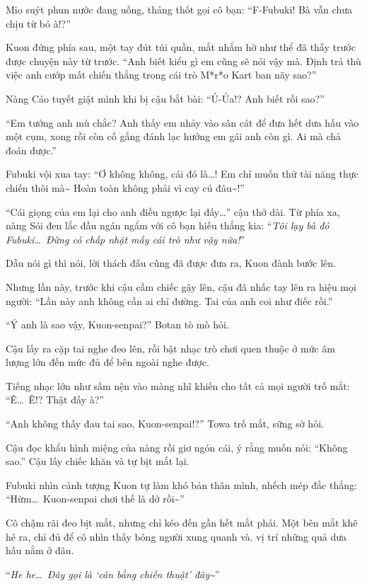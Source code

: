 \documentclass[../main.tex]{subfiles}
\begin{document}
Mio suýt phun nước đang uống, thảng thốt gọi cô bạn: ``F-Fubuki! Bà vẫn chưa chịu từ bỏ à!?''

Kuon đứng phía sau, một tay đút túi quần, mắt nhắm hờ như thể đã thấy trước được chuyện này từ trước. ``Anh biết kiểu gì em cũng sẽ nói vậy mà. Định trả thù việc anh cướp mất chiến thắng trong cái trò M*r*o Kart ban nãy sao?''

Nàng Cáo tuyết giật mình khi bị cậu bắt bài: ``Ủ-Ủa!? Anh biết rồi sao?''

``Em tưởng anh mù chắc? Anh thấy em nhảy vào sân cát để đưa hết dưa hấu vào một cụm, xong rồi còn cố gắng đánh lạc hướng em gái anh còn gì. Ai mà chả đoán được.''

Fubuki vội xua tay: ``Ơ không không, cái đó là\dots! Em chỉ muốn thử tài năng thực chiến thôi mà\~{} Hoàn toàn không phải vì cay cú đâu\~{}!''

``Cái giọng của em lại cho anh điều ngược lại đấy\dots'' cậu thở dài. Từ phía xa, nàng Sói đen lắc đầu ngán ngẩm với cô bạn hiếu thắng kia: ``\textit{Tôi lạy bà đó Fubuki\dots\ Đừng có chấp nhặt mấy cái trò như vậy nữa!}''

\ct

Dẫu nói gì thì nói, lời thách đấu cũng đã được đưa ra, Kuon đành bước lên.

Nhưng lần này, trước khi cậu cầm chiếc gậy lên, cậu đã nhấc tay lên ra hiệu mọi người: ``Lần này anh không cần ai chỉ đường. Tai của anh coi như điếc rồi.''

``Ý anh là sao vậy, Kuon-senpai?'' Botan tò mò hỏi.

Cậu lấy ra cặp tai nghe đeo lên, rồi bật nhạc trò chơi quen thuộc ở mức âm lượng lớn đến mức đủ để bên ngoài nghe được.

Tiếng nhạc lớn như sấm nện vào màng nhĩ khiến cho tất cả mọi người trố mắt: ``Ê\dots\ Ê!? Thật đấy à?''

``Anh không thấy đau tai sao, Kuon-senpai!?'' Towa trố mắt, sững sờ hỏi.

Cậu đọc khẩu hình miệng của nàng rồi giơ ngón cái, ý rằng muốn nói: ``Không sao.'' Cậu lấy chiếc khăn và tự bịt mắt lại.

Fubuki nhìn cảnh tượng Kuon tự làm khó bản thân mình, nhếch mép đắc thắng: ``Hừm\dots\ Kuon-senpai chơi thế là dở rồi\~{}''

Cô chậm rãi đeo bịt mắt, nhưng chỉ kéo đến gần hết mắt phải. Một bên mắt khẽ hé ra, chỉ đủ để cô nhìn thấy bóng người xung quanh và. vị trí những quả dưa hấu nằm ở đâu.

``\textit{He he\dots\ Đây gọi là `cân bằng chiến thuật' đây\~{}}''
\end{document}
